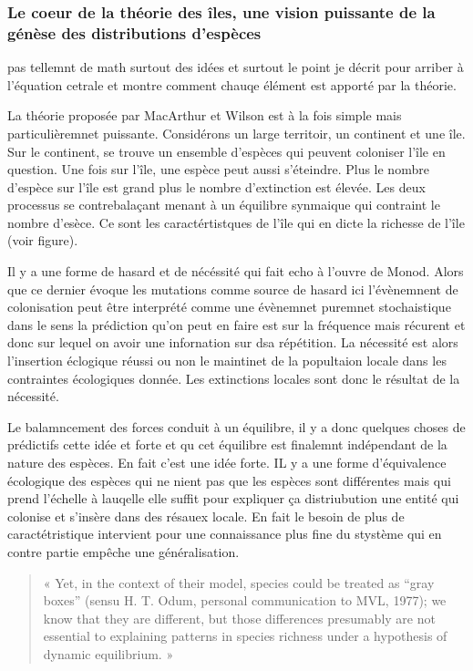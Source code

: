 \subsubsection{Le coeur de la théorie des îles, une vision puissante de
la génèse des distributions
d'espèces}\label{le-coeur-de-la-thuxe9orie-des-uxeeles-une-vision-puissante-de-la-guxe9nuxe8se-des-distributions-despuxe8ces}

pas tellemnt de math surtout des idées et surtout le point je décrit
pour arriber à l'équation cetrale et montre comment chauqe élément est
apporté par la théorie.

La théorie proposée par MacArthur et Wilson est à la fois simple mais
particulièremnet puissante. Considérons un large territoir, un continent
et une île. Sur le continent, se trouve un ensemble d'espèces qui
peuvent coloniser l'île en question. Une fois sur l'île, une espèce peut
aussi s'éteindre. Plus le nombre d'espèce sur l'île est grand plus le
nombre d'extinction est élevée. Les deux processus se contrebalaçant
menant à un équilibre synmaique qui contraint le nombre d'esèce. Ce sont
les caractértistques de l'île qui en dicte la richesse de l'île (voir
figure).

Il y a une forme de hasard et de nécéssité qui fait echo à l'ouvre de
Monod. Alors que ce dernier évoque les mutations comme source de hasard
ici l'évènemnent de colonisation peut être interprété comme une
évènemnet puremnet stochaistique dans le sens la prédiction qu'on peut
en faire est sur la fréquence mais récurent et donc sur lequel on avoir
une infornation sur dsa répétition. La nécessité est alors l'insertion
éclogique réussi ou non le maintinet de la popultaion locale dans les
contraintes écologiques donnée. Les extinctions locales sont donc le
résultat de la nécessité.

Le balamncement des forces conduit à un équilibre, il y a donc quelques
choses de prédictifs cette idée et forte et qu cet équilibre est
finalemnt indépendant de la nature des espèces. En fait c'est une idée
forte. IL y a une forme d'équivalence écologique des espèces qui ne
nient pas que les espèces sont différentes mais qui prend l'échelle à
lauqelle elle suffit pour expliquer ça distriubution une entité qui
colonise et s'insère dans des résauex locale. En fait le besoin de plus
de caractétristique intervient pour une connaissance plus fine du
stystème qui en contre partie empêche une généralisation.

\begin{quote}
« Yet, in the context of their model, species could be treated as ``gray
boxes'' (sensu H. T. Odum, personal communication to MVL, 1977); we know
that they are different, but those differences presumably are not
essential to explaining patterns in species richness under a hypothesis
of dynamic equilibrium. »
\end{quote}

